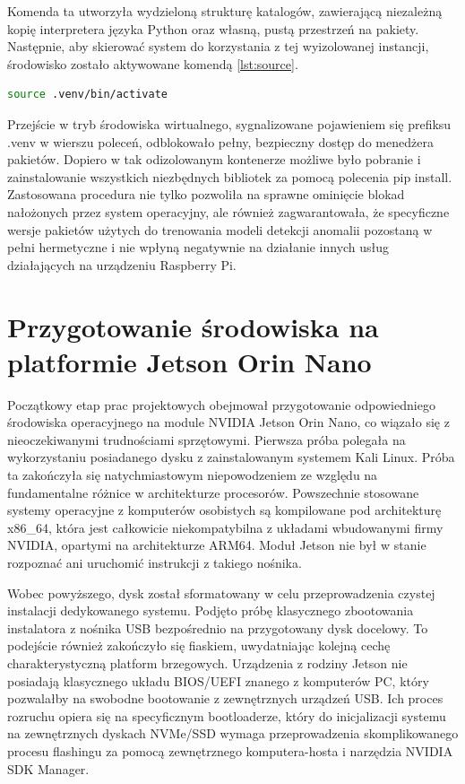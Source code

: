 \documentclass[12pt,twoside]{article}
\begin{document}
Komenda ta utworzyła wydzieloną strukturę katalogów, zawierającą niezależną kopię interpretera języka Python oraz własną, pustą przestrzeń na pakiety. Następnie, aby skierować system do korzystania z tej wyizolowanej instancji, środowisko zostało aktywowane komendą \ref{lst:source}.
\begin{lstlisting}[language=bash, numbers=none, caption={Włączenie środowiska venv}, label={lst:source}]
source .venv/bin/activate
\end{lstlisting}

Przejście w tryb środowiska wirtualnego, sygnalizowane pojawieniem się prefiksu .venv w wierszu poleceń, odblokowało pełny, bezpieczny dostęp do menedżera pakietów. Dopiero w tak odizolowanym kontenerze możliwe było pobranie i zainstalowanie wszystkich niezbędnych bibliotek za pomocą polecenia pip install. Zastosowana procedura nie tylko pozwoliła na sprawne ominięcie blokad nałożonych przez system operacyjny, ale również zagwarantowała, że specyficzne wersje pakietów użytych do trenowania modeli detekcji anomalii pozostaną w pełni hermetyczne i nie wpłyną negatywnie na działanie innych usług działających na urządzeniu Raspberry Pi.

\section{Przygotowanie środowiska na platformie Jetson Orin Nano}
Początkowy etap prac projektowych obejmował przygotowanie odpowiedniego środowiska operacyjnego na module NVIDIA Jetson Orin Nano, co wiązało się z nieoczekiwanymi trudnościami sprzętowymi. Pierwsza próba polegała na wykorzystaniu posiadanego dysku z zainstalowanym systemem Kali Linux. Próba ta zakończyła się natychmiastowym niepowodzeniem ze względu na fundamentalne różnice w architekturze procesorów. Powszechnie stosowane systemy operacyjne z komputerów osobistych są kompilowane pod architekturę x86\_64, która jest całkowicie niekompatybilna z układami wbudowanymi firmy NVIDIA, opartymi na architekturze ARM64. Moduł Jetson nie był w stanie rozpoznać ani uruchomić instrukcji z takiego nośnika.

Wobec powyższego, dysk został sformatowany w celu przeprowadzenia czystej instalacji dedykowanego systemu. Podjęto próbę klasycznego zbootowania instalatora z nośnika USB bezpośrednio na przygotowany dysk docelowy. To podejście również zakończyło się fiaskiem, uwydatniając kolejną cechę charakterystyczną platform brzegowych. Urządzenia z rodziny Jetson nie posiadają klasycznego układu BIOS/UEFI znanego z komputerów PC, który pozwalałby na swobodne bootowanie z zewnętrznych urządzeń USB. Ich proces rozruchu opiera się na specyficznym bootloaderze, który do inicjalizacji systemu na zewnętrznych dyskach NVMe/SSD wymaga przeprowadzenia skomplikowanego procesu flashingu za pomocą zewnętrznego komputera-hosta i narzędzia NVIDIA SDK Manager.
\end{document}
